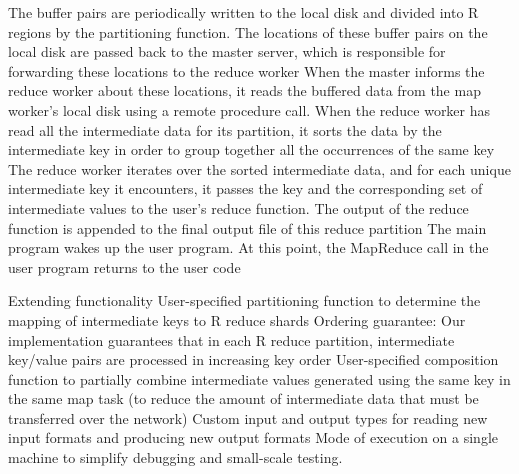 \documentclass[a4paper,twoside]{scrbook}
\begin{document}
The buffer pairs are periodically written to the local disk and divided into R regions by the partitioning function. The locations of these buffer pairs on the local disk are passed back to the master server, which is responsible for forwarding these locations to the reduce worker
When the master informs the reduce worker about these locations, it reads the buffered data from the map worker's local disk using a remote procedure call. When the reduce worker has read all the intermediate data for its partition, it sorts the data by the intermediate key in order to group together all the occurrences of the same key
The reduce worker iterates over the sorted intermediate data, and for each unique intermediate key it encounters, it passes the key and the corresponding set of intermediate values to the user's reduce function. The output of the reduce function is appended to the final output file of this reduce partition
The main program wakes up the user program. At this point, the MapReduce call in the user program returns to the user code
\par
Extending functionality
User-specified partitioning function to determine the mapping of intermediate keys to R reduce shards
Ordering guarantee: Our implementation guarantees that in each R reduce partition, intermediate key/value pairs are processed in increasing key order
User-specified composition function to partially combine intermediate values generated using the same key in the same map task (to reduce the amount of intermediate data that must be transferred over the network)
Custom input and output types for reading new input formats and producing new output formats
Mode of execution on a single machine to simplify debugging and small-scale testing.
\end{document}
